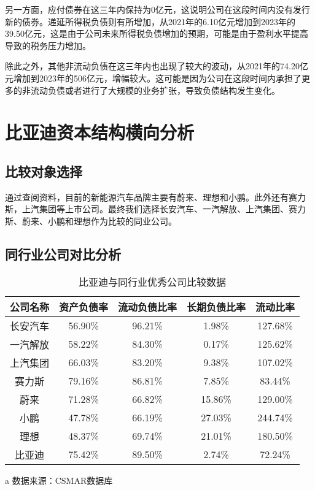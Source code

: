 另一方面，应付债券在这三年内保持为0亿元，这说明公司在这段时间内没有发行新的债券。递延所得税负债则有所增加，从2021年的6.10亿元增加到2023年的39.50亿元，这是由于公司未来所得税负债增加的预期，可能是由于盈利水平提高导致的税务压力增加。

除此之外，其他非流动负债在这三年内也出现了较大的波动，从2021年的74.20亿元增加到2023年的506亿元，增幅较大。这可能是因为公司在这段时间内承担了更多的非流动负债或者进行了大规模的业务扩张，导致负债结构发生变化。

\section{比亚迪资本结构横向分析}
\subsection{比较对象选择}
通过查阅资料，目前的新能源汽车品牌主要有蔚来、理想和小鹏。此外还有赛力斯，上汽集团等上市公司。最终我们选择长安汽车、一汽解放、上汽集团、赛力斯、蔚来、小鹏和理想作为比较的同业公司。
\subsection{同行业公司对比分析}
\begin{table}
  \centering
  \begin{threeparttable}[c]
    \caption{比亚迪与同行业优秀公司比较数据}
    \label{tab:comparing-with-other-companies}
    \begin{tabular}{ccccc}
      \toprule
        公司名称 & 资产负债率 & 流动负债比率 & 长期负债比率 & 流动比率  \\ 
      \midrule
        长安汽车 & 56.90\% & 96.21\% & 1.98\% & 127.68\% \\ 
        一汽解放 & 58.22\% & 84.30\% & 0.17\% & 125.62\% \\ 
        上汽集团 & 66.03\% & 83.20\% & 9.38\% & 107.02\% \\ 
        赛力斯 & 79.16\% & 86.81\% & 7.85\% & 83.44\% \\ 
        蔚来 & 71.28\% & 66.82\% & 15.86\% & 129.00\% \\ 
        小鹏 & 47.78\% & 66.19\% & 27.03\% & 244.74\% \\ 
        理想 & 48.37\% & 69.74\% & 21.01\% & 180.50\% \\ 
        比亚迪 & 75.42\% & 89.50\% & 2.74\% & 72.24\% \\ 
      \bottomrule
    \end{tabular}
    \begin{tablenotes}
      \item [a] 数据来源：CSMAR数据库
    \end{tablenotes}
  \end{threeparttable}
\end{table}

